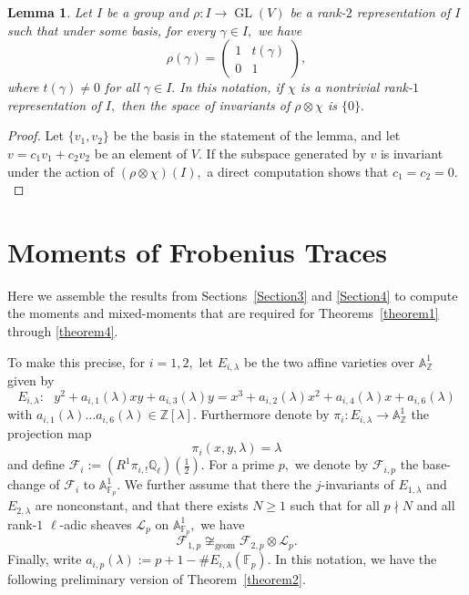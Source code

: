 \documentclass[12pt]{amsart}
\newtheorem{lemma}[theorem]{Lemma}
\theoremstyle{definition}
\theoremstyle{remark}
\numberwithin{equation}{section}
\def\A{\mathbb A}
\def\F{{\mathbb F}}
\def\Z{{\mathbb Z}}
\def\Q{{\mathbb Q}}
\def\Z{\mathbb{Z}}
\def\Q{\mathbb{Q}}
\def\F{\mathbb{F}}
\DeclareMathOperator{\GL}{GL}
\begin{document}
\begin{lemma}\label{inertGeoConst}
    Let $I$ be a group and $\rho:I\to\GL(V)$ be a rank-$2$ representation of $I$ such that under some basis, for every $\gamma\in I,$ we have
    $$
    \rho(\gamma)=\begin{pmatrix}
        1 & t(\gamma) \\
        0 & 1
    \end{pmatrix},
    $$
    where $t(\gamma)\neq 0$ for all $\gamma\in I.$ In this notation, if $\chi$ is a nontrivial rank-$1$ representation of $I,$ then the space of invariants of $\rho\otimes\chi$ is $\{0\}.$
\end{lemma}

\begin{proof}
    Let $\{v_1,v_2\}$ be the basis in the statement of the lemma, and let $v=c_1v_1+c_2v_2$ be an element of $V.$ If the subspace generated by $v$ is invariant under the action of $(\rho\otimes\chi)(I),$ a direct computation shows that $c_1=c_2=0.$
\end{proof}

\section{Moments of Frobenius Traces}\label{Section5}

Here we assemble the results from Sections~\ref{Section3} and \ref{Section4} to compute the moments and mixed-moments that are required for Theorems~\ref{theorem1} through \ref{theorem4}.

To make this precise, for $i=1,2,$ let $E_{i,\lambda}$ be the two affine varieties over $\A^1_\Z$ given by
$$
E_{i,\lambda}:\ \ \ y^2+a_{i,1}(\lambda)xy+a_{i,3}(\lambda)y=x^3+a_{i,2}(\lambda)x^2+a_{i,4}(\lambda)x+a_{i,6}(\lambda)
$$
with $a_{i,1}(\lambda)\ldots a_{i,6}(\lambda)\in\Z[\lambda].$ Furthermore denote by $\pi_i:E_{i,\lambda}\to \A^1_\Z$ the projection map
$$
\pi_i(x,y,\lambda)=\lambda
$$
and define $\mathcal{F}_i:=(R^1\pi_{i,!}\Q_\ell)(\frac{1}{2}).$ For a prime $p,$ we denote by $\mathcal{F}_{i,p}$ the base-change of $\mathcal{F}_i$ to $\A^1_{\F_p}.$  We further assume that there the $j$-invariants of $E_{1,\lambda}$ and $E_{2,\lambda}$ are nonconstant, and that there exists $N\geq 1$ such that for all $p\nmid N$ and all rank-$1$ $\ell$-adic sheaves $\mathcal{L}_p$ on $\A_{\F_p}^1,$ we have
$$
\mathcal{F}_{1,p}\not\cong_{\text{geom}}\mathcal{F}_{2,p}\otimes\mathcal{L}_p.
$$
Finally, write $a_{i,p}(\lambda):=p+1-\#E_{i,\lambda}(\F_p).$ In this notation, we have the following preliminary version of Theorem~\ref{theorem2}.
\end{document}
